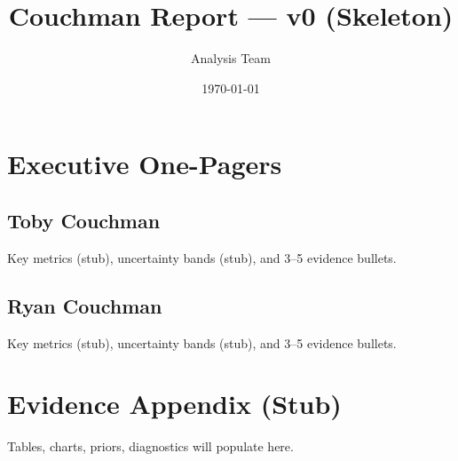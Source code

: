\documentclass[11pt]{article}
\title{Couchman Report — v0 (Skeleton)}
\author{Analysis Team}
\date{\today}
\begin{document}
\maketitle
\section*{Executive One-Pagers}
\subsection*{Toby Couchman}
Key metrics (stub), uncertainty bands (stub), and 3–5 evidence bullets.
\subsection*{Ryan Couchman}
Key metrics (stub), uncertainty bands (stub), and 3–5 evidence bullets.
\section{Evidence Appendix (Stub)}
Tables, charts, priors, diagnostics will populate here.
\end{document}
